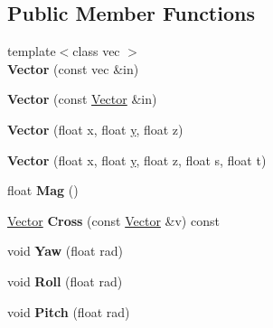 \subsection*{Public Member Functions}
\begin{DoxyCompactItemize}
\item 
{\footnotesize template$<$class vec $>$ }\\{\bfseries Vector} (const vec \&in)\hypertarget{classStarSystemGent_1_1Vector_aa97d65edb6b10e7c1392612eaa927fd9}{}\label{classStarSystemGent_1_1Vector_aa97d65edb6b10e7c1392612eaa927fd9}

\item 
{\bfseries Vector} (const \hyperlink{classStarSystemGent_1_1Vector}{Vector} \&in)\hypertarget{classStarSystemGent_1_1Vector_a78299845cc53fb96bb39ab58ad617b7a}{}\label{classStarSystemGent_1_1Vector_a78299845cc53fb96bb39ab58ad617b7a}

\item 
{\bfseries Vector} (float x, float \hyperlink{IceUtils_8h_aa7ffaed69623192258fb8679569ff9ba}{y}, float z)\hypertarget{classStarSystemGent_1_1Vector_a9007fb2df86a3bee7c9da35f2b45d859}{}\label{classStarSystemGent_1_1Vector_a9007fb2df86a3bee7c9da35f2b45d859}

\item 
{\bfseries Vector} (float x, float \hyperlink{IceUtils_8h_aa7ffaed69623192258fb8679569ff9ba}{y}, float z, float s, float t)\hypertarget{classStarSystemGent_1_1Vector_a02802936c65aefb84dabb578ac4fb866}{}\label{classStarSystemGent_1_1Vector_a02802936c65aefb84dabb578ac4fb866}

\item 
float {\bfseries Mag} ()\hypertarget{classStarSystemGent_1_1Vector_aa3a4fdc6310063f8f7f4eb39137448fc}{}\label{classStarSystemGent_1_1Vector_aa3a4fdc6310063f8f7f4eb39137448fc}

\item 
\hyperlink{classStarSystemGent_1_1Vector}{Vector} {\bfseries Cross} (const \hyperlink{classStarSystemGent_1_1Vector}{Vector} \&v) const \hypertarget{classStarSystemGent_1_1Vector_a14e656bc5f377c23af52d786cf45fd7c}{}\label{classStarSystemGent_1_1Vector_a14e656bc5f377c23af52d786cf45fd7c}

\item 
void {\bfseries Yaw} (float rad)\hypertarget{classStarSystemGent_1_1Vector_a8098173bf1fb5de36af955a641b016d3}{}\label{classStarSystemGent_1_1Vector_a8098173bf1fb5de36af955a641b016d3}

\item 
void {\bfseries Roll} (float rad)\hypertarget{classStarSystemGent_1_1Vector_a1f39304a1978ec68ccc16a25644e4cf3}{}\label{classStarSystemGent_1_1Vector_a1f39304a1978ec68ccc16a25644e4cf3}

\item 
void {\bfseries Pitch} (float rad)\hypertarget{classStarSystemGent_1_1Vector_a19c9b9a22302be314be9ad57c8cc8fe3}{}\label{classStarSystemGent_1_1Vector_a19c9b9a22302be314be9ad57c8cc8fe3}

\end{DoxyCompactItemize}
